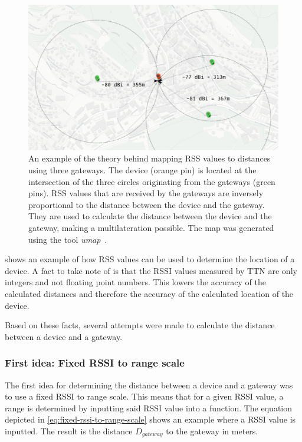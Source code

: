 \begin{figure}[htbp]
    \centering
    \includegraphics[width=1\textwidth]{pictures/multilateration/rssi-multilateration-example.png}
    \caption{
        An example of the theory behind mapping \ac{RSS} values to distances using three gateways.
        The device (orange pin) is located at the intersection of the three circles originating from the gateways (green pins).
        \ac{RSS} values that are received by the gateways are inversely proportional to the distance between the device and the gateway.
        They are used to calculate the distance between the device and the gateway, making a multilateration possible.
        The map was generated using the tool \emph{umap}~\cite{noauthor_umap_nodate}.
    }\label{fig:rssi-multilateration-theoretical-example}
\end{figure}

 shows an example of how \ac{RSS} values can be used to determine the location of a device.
A fact to take note of is that the \ac{RSSI} values measured by \ac{TTN} are only integers and not floating point numbers.
This lowers the accuracy of the calculated distances and therefore the accuracy of the calculated location of the device.

Based on these facts, several attempts were made to calculate the distance between a device and a gateway.

\subsubsection{First idea: Fixed \acs{RSSI} to range scale}\label{sec:fixed-rssi-to-range-scale}\label{sec:fixed-rssi-to-range-scale-impl}

The first idea for determining the distance between a device and a gateway was to use a fixed \ac{RSSI} to range scale.
This means that for a given \ac{RSSI} value, a range is determined by inputting said \ac{RSSI} value into a function.
The equation depicted in \cref{eq:fixed-rssi-to-range-scale} shows an example where a \ac{RSSI} value is inputted.
The result is the distance $D_{gateway}$ to the gateway in meters.

